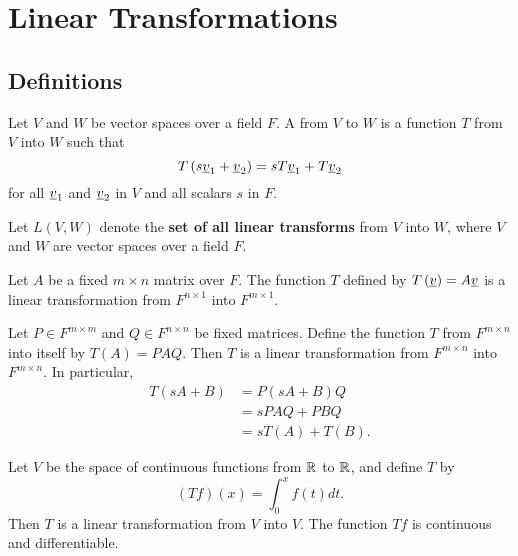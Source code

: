 \section{Linear Transformations}

\subsection{Definitions}

\begin{definition}
Let $V$ and $W$ be vector spaces over a field $F$.
A  from $V$ to $W$ is a function $T$ from $V$ into $W$ such that
\begin{equation*}
T \left( s \underline{v}_1 + \underline{v}_2 \right)
= s T \underline{v}_1 + T \underline{v}_2
\end{equation*}
for all $\underline{v}_1$ and $\underline{v}_2$ in $V$ and all scalars $s$ in $F$.
\end{definition}

\begin{definition}
Let $L(V,W)$ denote the \textbf{set of all linear transforms} from $V$ into $W$, where $V$ and $W$ are vector spaces over a field $F$.
\end{definition}

\begin{example}
Let $A$ be a fixed $m \times n$ matrix over $F$.
The function $T$ defined by $T \left( \underline{v} \right) = A \underline{v}$ is a linear transformation from $F^{n \times 1}$ into $F^{m \times 1}$.
\end{example}

\begin{example}
Let $P \in F^{m \times m}$ and $Q \in F^{n \times n}$ be fixed matrices.
Define the function $T$ from $F^{m \times n}$ into itself by $T(A) = P A Q$.
Then $T$ is a linear transformation from $F^{m \times n}$ into $F^{m \times n}$.
In particular,
\begin{equation*}
\begin{split}
T \left( s A + B \right)
&= P \left( s A + B \right) Q \\
&= s P A Q + P B Q \\
&= s T \left( A \right) + T \left( B \right) .
\end{split}
\end{equation*}
\end{example}

\begin{example}
Let $V$ be the space of continuous functions from $\mathbb{R}$ to $\mathbb{R}$, and define $T$ by
\begin{equation*}
(Tf)(x) = \int_{0}^x f(t) dt .
\end{equation*}
Then $T$ is a linear transformation from $V$ into $V$.
The function $Tf$ is continuous and differentiable.
\end{example}

